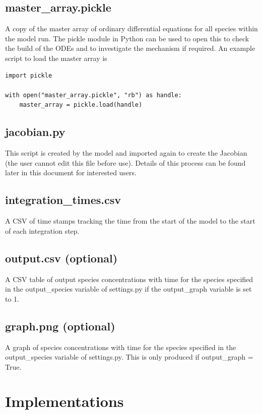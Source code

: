 \documentclass[a4paper]{refart}
\begin{document}
\subsection{master\_array.pickle}
A copy of the master array of ordinary differential equations for all species within the model run. The pickle module in Python can be used to open this to check the build of the ODEs and to investigate the mechanism if required. An example script to load the master array is
\begin{verbatim}
import pickle
    
with open("master_array.pickle", "rb") as handle:
    master_array = pickle.load(handle)
\end{verbatim}


\subsection{jacobian.py}
This script is created by the model and imported again to create the Jacobian (the user cannot edit this file before use). Details of this process can be found later in this document for interested users. 

\subsection{integration\_times.csv}
A CSV of time stamps tracking the time from the start of the model to the start of each integration step. 

\subsection{output.csv (optional)}
A CSV table of output species concentrations with time for the species specified in the output\_species variable of settings.py if the output\_graph variable is set to 1.

\subsection{graph.png (optional)}
A graph of species concentrations with time for the species specified in the output\_species variable of settings.py. This is only produced if output\_graph = True.

\newpage
\section{Implementations}
\end{document}
